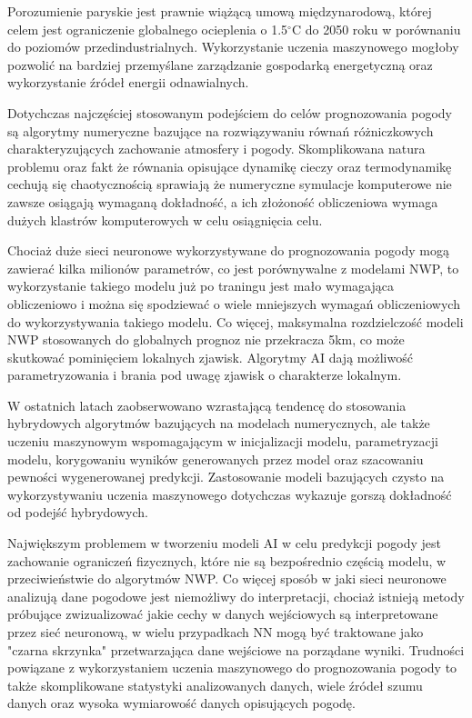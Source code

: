 Porozumienie paryskie jest prawnie wiążącą umową międzynarodową,
której celem jest ograniczenie globalnego ocieplenia o 1.5$^{\circ}$C
do 2050 roku w porównaniu do poziomów przedindustrialnych. Wykorzystanie
uczenia maszynowego mogłoby pozwolić na bardziej przemyślane zarządzanie
gospodarką energetyczną oraz wykorzystanie źródeł energii odnawialnych.

Dotychczas najczęściej stosowanym podejściem do celów prognozowania
pogody są algorytmy numeryczne bazujące na rozwiązywaniu równań różniczkowych
charakteryzujących zachowanie atmosfery i pogody. Skomplikowana natura
problemu oraz fakt że równania opisujące dynamikę cieczy oraz termodynamikę
cechują się chaotycznością sprawiają że numeryczne symulacje komputerowe
nie zawsze osiągają wymaganą dokładność, a ich złożoność obliczeniowa
wymaga dużych klastrów komputerowych w celu osiągnięcia celu.

Chociaż duże sieci neuronowe wykorzystywane do prognozowania pogody
mogą zawierać kilka milionów parametrów, co jest porównywalne z modelami
NWP\cite{can-dl-beat-numerical}, to wykorzystanie takiego modelu już po traningu
jest mało wymagająca obliczeniowo i można się spodziewać o wiele mniejszych wymagań
obliczeniowych do wykorzystywania takiego modelu. Co więcej, maksymalna rozdzielczość
modeli NWP stosowanych do globalnych prognoz nie przekracza 5km, 
co może skutkować pominięciem lokalnych zjawisk. Algorytmy AI dają możliwość
parametryzowania i brania pod uwagę zjawisk o charakterze lokalnym.

W ostatnich latach zaobserwowano wzrastającą tendencę do stosowania hybrydowych
algorytmów bazujących na modelach numerycznych, ale także uczeniu maszynowym
wspomagającym w inicjalizacji modelu, parametryzacji modelu, korygowaniu
wyników generowanych przez model oraz szacowaniu pewności wygenerowanej
predykcji. Zastosowanie modeli bazujących czysto na wykorzystywaniu uczenia
maszynowego dotychczas wykazuje gorszą dokładność od podejść hybrydowych.

Największym problemem w tworzeniu modeli AI w celu predykcji pogody jest
zachowanie ograniczeń fizycznych, które nie są bezpośrednio częścią modelu,
w przeciwieństwie do algorytmów NWP. Co więcej sposób w jaki sieci neuronowe
analizują dane pogodowe jest niemożliwy do interpretacji, chociaż istnieją
metody próbujące zwizualizować jakie cechy w danych wejściowych są interpretowane
przez sieć neuronową, w wielu przypadkach NN mogą być traktowane jako "czarna 
skrzynka" przetwarzająca dane wejściowe na porządane wyniki. Trudności powiązane
z wykorzystaniem uczenia maszynowego do prognozowania pogody to także skomplikowane
statystyki analizowanych danych, wiele źródeł szumu danych oraz wysoka wymiarowość
danych opisujących pogodę.

